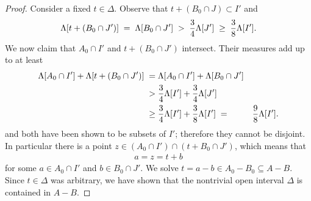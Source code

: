 \begin{proof}
  Consider a fixed $t \in \Delta$.
  Observe that $t + (B_0 \cap J) \subset I'$ and
  \begin{align*}
    \Lambda[t + (B_0 \cap J')] \; = \; \Lambda[B_0 \cap J']
      \; > \; \frac{3}{4} \Lambda[J'] \; \ge \; \frac{3}{8} \Lambda[I'] .
  \end{align*}
  We now claim that $A_0 \cap I'$ and $t + (B_0 \cap J')$ intersect.
  Their measures add up to at least
  \begin{align*}
    \Lambda[A_0 \cap I'] + \Lambda[t + (B_0 \cap J')]
    \; = \; & \Lambda[A_0 \cap I'] + \Lambda[B_0 \cap J'] \\
    \; > \; & \frac{3}{4} \Lambda[I'] + \frac{3}{4} \Lambda[J'] \\
    \; \ge \; & \frac{3}{4} \Lambda[I'] + \frac{3}{8} \Lambda[I']
    \; = \; & \frac{9}{8} \Lambda[I'] .
  \end{align*}
  and both have been shown to be subsets of $I'$; therefore they
  cannot be disjoint.
  In particular there is a point $z \in (A_0 \cap I') \cap (t + B_0 \cap J')$,
  which means that
  \begin{align*}
    a = z = t + b
  \end{align*}
  for some $a \in A_0 \cap I'$ and $b \in B_0 \cap J'$. We solve
  $t = a - b \in A_0 - B_0 \subseteq A - B$. Since $t \in \Delta$
  was arbitrary, we have shown that the nontrivial open interval $\Delta$
  is contained in $A - B$.
\end{proof}
